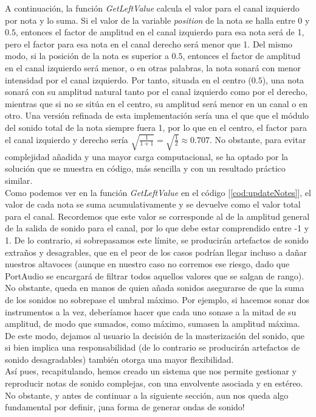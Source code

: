 A continuación, la función \emph{GetLeftValue} calcula el valor para el canal izquierdo por nota y lo suma. Si el valor de la variable \emph{position} de la nota se halla entre 0 y \(0.5\), entonces el factor  de amplitud en el canal izquierdo para esa nota será de 1, pero el factor para esa nota en el canal derecho será menor que 1. Del mismo modo, si la posición de la nota es superior a \(0.5\), entonces el factor de amplitud en el canal izquierdo será menor, o en otras palabras, la nota sonará con menor intensidad por el canal izquierdo. Por tanto, situada en el centro (\(0.5\)), una nota sonará con su amplitud natural tanto por el canal izquierdo como por el derecho, mientras que si no se sitúa en el centro, su amplitud será menor en un canal o en otro. Una versión refinada de esta implementación sería una el que que el módulo del sonido total de la nota siempre fuera 1, por lo que en el centro, el factor para el canal izquierdo y derecho sería \(\sqrt{\frac{1}{1 + 1}} = \sqrt{\frac{1}{2}} \approx 0.707\). No obstante, para evitar complejidad añadida y una mayor carga computacional, se ha optado por la solución que se muestra en código, más sencilla y con un resultado práctico similar.\\

Como podemos ver en la función \emph{GetLeftValue} en el código [\ref{cod:updateNotes}], el valor de cada nota se suma acumulativamente y se devuelve como el valor total para el canal. Recordemos que este valor se corresponde al de la amplitud general de la salida de sonido para el canal, por lo que debe estar comprendido entre -1 y 1. De lo contrario, si sobrepasamos este límite, se producirán artefactos de sonido extraños y desagrables, que en el peor de los casos podrían llegar incluso a dañar nuestros altavoces (aunque en nuestro caso no corremos ese riesgo, dado que PortAudio se encargará de filtrar todos aquellos valores que se salgan de rango). No obstante, queda en manos de quien añada sonidos asegurarse de que la suma de los sonidos no sobrepase el umbral máximo. Por ejemplo, si hacemos sonar dos instrumentos a la vez, deberíamos hacer que cada uno sonase a la mitad de su amplitud, de modo que sumados, como máximo, sumasen la amplitud máxima. De este modo, dejamos al usuario la decisión de la masterización del sonido, que si bien implica una responsabilidad (de lo contrario se producirán artefactos de sonido desagradables) también otorga una mayor flexibilidad.\\

Así pues, recapitulando, hemos creado un sistema que nos permite gestionar y reproducir notas de sonido complejas, con una envolvente asociada y en estéreo. No obstante, y antes de continuar a la siguiente sección, aun nos queda algo fundamental por definir, ¡una forma de generar ondas de sonido!\\

